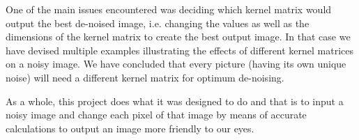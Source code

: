 \documentclass[paper=a4, fontsize=11pt]{scrartcl} %
\numberwithin{equation}{section} %
\numberwithin{figure}{section} %
\numberwithin{table}{section} %
\begin{document}
One of the main issues encountered was deciding which kernel matrix would output the best de-noised image, i.e. changing the values as well as the dimensions of the kernel matrix to create the best output image. In that case we have devised multiple examples illustrating the effects of different kernel matrices on a noisy image. We have concluded that every picture (having its own unique noise) will need a different kernel matrix for optimum de-noising.


As a whole, this project does what it was designed to do and that is to input a noisy image and change each pixel of that image by means of accurate calculations to output an image more friendly to our eyes.
\end{document}
